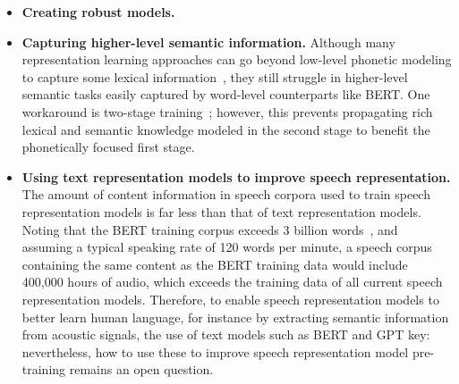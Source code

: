 \begin{itemize}
\item \textbf{Creating robust models.} 

\item \textbf{Capturing higher-level semantic information.} Although many representation learning approaches can go beyond low-level phonetic modeling to capture some lexical information~\parencite{nguyen_are_2022}, they still struggle in higher-level semantic tasks easily captured by word-level counterparts like BERT. One workaround is two-stage training~\parencite{kharitonov_textfree_2021, nguyen_generative_2022}; however, this prevents propagating rich lexical and semantic knowledge modeled in the second stage to benefit the phonetically focused first stage.

\item \textbf{Using text representation models to improve speech representation.} The amount of content information in speech corpora used to train speech representation models is far less than that of text representation models. Noting that the BERT training corpus exceeds 3 billion words~\parencite{devlin_bert_2018}, and assuming a typical speaking rate of 120 words per minute, a speech corpus containing the same content as the BERT training data would include 400,000 hours of audio, which exceeds the  training data of all current speech representation models. Therefore, to enable speech representation models to better learn human language, for instance by extracting semantic information from acoustic signals, the use of text models such as BERT and GPT   key: nevertheless, how to use these to improve speech representation model pre-training remains an open question. 

\end{itemize}

